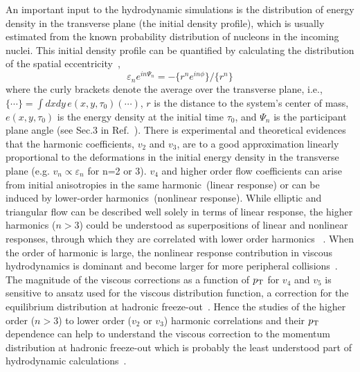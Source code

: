 \documentclass[ALICE,manyauthors]{cernphprep}
\begin{document}
An important input to the hydrodynamic simulations is the distribution of energy density in the transverse plane (the initial density profile), which is usually estimated from the known probability distribution of nucleons in the incoming nuclei.
This initial density profile can be quantified by calculating the distribution of the spatial eccentricity~\cite{Alver:2010gr},
\begin{equation}
 \varepsilon_{n} e^{in\Psi_{n}} = -\{r^n e^{in\phi}\}/ \{r^n\} 
  \label{eq:eccentricities}
\end{equation}
where the curly brackets denote the average over the transverse plane, i.e., $\{\cdots\} = \int dxdy\, e(x,y,\tau_0) (\cdots)$, $r$ is the distance to the system's center of mass, $e(x,y,\tau_0)$ is the energy density at the initial time $\tau_0$, and $\Psi_{n}$ is the participant plane angle (see Sec.3 in Ref.~\cite{Niemi:2015qia}).
There is experimental and theoretical evidences~\cite{Alver:2010gr,Qiu:2011iv} that the harmonic coefficients, $v_2$ and $v_3$, are to a good approximation linearly proportional to the deformations in the initial energy density in the transverse plane (e.g. $v_n \propto \varepsilon_n$ for n=2 or 3).
$v_4$ and higher order flow coefficients can arise from initial anisotropies in the same harmonic~\cite{Alver:2010gr,Teaney:2010vd,Gubser:2010ui,Hatta:2014jva}(linear response) or can be induced by lower-order harmonics~\cite{Bravina:2013xla,Bravina:2013ora}(nonlinear response).
While elliptic and triangular flow can be described well solely in terms of linear response, the higher harmonics ($n>3$) could be understood as superpositions of linear and nonlinear responses, through which they are correlated with lower order harmonics ~\cite{Teaney:2012ke,Bravina:2013ora,Gubser:2010ui,Hatta:2014jva}. When the order of harmonic is large, the nonlinear response contribution in viscous hydrodynamics is dominant and become larger for more peripheral collisions~\cite{Teaney:2012ke,Bravina:2013ora}.
The magnitude of the viscous corrections as a function of $p_{\rm T}$ for $v_4$ and $v_5$ is sensitive to ansatz used for the viscous distribution function, a correction for the equilibrium distribution at hadronic freeze-out~\cite{Luzum:2010ad}.
Hence the studies of the higher order ($n>3$) to lower order ($v_2$ or $v_3$) harmonic correlations and their $p_{\rm T}$ dependence can help to understand the viscous correction to the momentum distribution at hadronic freeze-out which is probably the least understood part of hydrodynamic calculations~\cite{Teaney:2012ke,Niemi:2015qia}.
\end{document}
